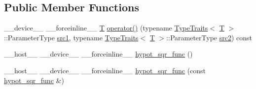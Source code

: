 \subsection*{Public Member Functions}
\begin{DoxyCompactItemize}
\item 
\-\_\-\-\_\-device\-\_\-\-\_\- \-\_\-\-\_\-forceinline\-\_\-\-\_\- \hyperlink{calib3d_8hpp_a3efb9551a871ddd0463079a808916717}{T} \hyperlink{structcv_1_1gpu_1_1device_1_1hypot__sqr__func_a2220066ef73111970d08056772485f2f}{operator()} (typename \hyperlink{structcv_1_1gpu_1_1device_1_1TypeTraits}{Type\-Traits}$<$ \hyperlink{calib3d_8hpp_a3efb9551a871ddd0463079a808916717}{T} $>$\-::Parameter\-Type \hyperlink{core__c_8h_a897de4702c922f4cccda0d57ccdcafb3}{src1}, typename \hyperlink{structcv_1_1gpu_1_1device_1_1TypeTraits}{Type\-Traits}$<$ \hyperlink{calib3d_8hpp_a3efb9551a871ddd0463079a808916717}{T} $>$\-::Parameter\-Type \hyperlink{core__c_8h_a7561a36d48069d54a6c8ac4e4750edfd}{src2}) const 
\item 
\-\_\-\-\_\-host\-\_\-\-\_\- \-\_\-\-\_\-device\-\_\-\-\_\- \-\_\-\-\_\-forceinline\-\_\-\-\_\- \hyperlink{structcv_1_1gpu_1_1device_1_1hypot__sqr__func_a3a09a27c0417b3303be0ae9cf52845a4}{hypot\-\_\-sqr\-\_\-func} ()
\item 
\-\_\-\-\_\-host\-\_\-\-\_\- \-\_\-\-\_\-device\-\_\-\-\_\- \-\_\-\-\_\-forceinline\-\_\-\-\_\- \hyperlink{structcv_1_1gpu_1_1device_1_1hypot__sqr__func_a62983cbf59ecaeee7c138ae4323220ae}{hypot\-\_\-sqr\-\_\-func} (const \hyperlink{structcv_1_1gpu_1_1device_1_1hypot__sqr__func}{hypot\-\_\-sqr\-\_\-func} \&)
\end{DoxyCompactItemize}


